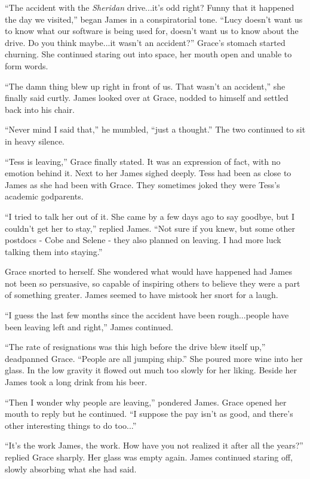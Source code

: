 \documentclass[12pt]{article} %
\begin{document}
``The accident with the \textit{Sheridan} drive...it's odd right? Funny that it happened the day we visited,'' began James in a conspiratorial tone. ``Lucy doesn't want us to know what our software is being used for, doesn't want us to know about the drive. Do you think maybe...it wasn't an accident?'' Grace's stomach started churning. She continued staring out into space, her mouth open and unable to form words. 

``The damn thing blew up right in front of us. That wasn't an accident,'' she finally said curtly. James looked over at Grace, nodded to himself and settled back into his chair.

``Never mind I said that,'' he mumbled, ``just a thought.'' The two continued to sit in heavy silence.

``Tess is leaving,'' Grace finally stated. It was an expression of fact, with no emotion behind it. Next to her James sighed deeply. Tess had been as close to James as she had been with Grace. They sometimes joked they were Tess's academic godparents.

``I tried to talk her out of it. She came by a few days ago to say goodbye, but I couldn't get her to stay,'' replied James. ``Not sure if you knew, but some other postdocs - Cobe and Selene - they also planned on leaving. I had more luck talking them into staying.''

Grace snorted to herself. She wondered what would have happened had James not been so persuasive, so capable of inspiring others to believe they were a part of something greater. James seemed to have mistook her snort for a laugh.

``I guess the last few months since the accident have been rough...people have been leaving left and right,'' James continued.

``The rate of resignations was this high before the drive blew itself up,'' deadpanned Grace. ``People are all jumping ship.'' She poured more wine into her glass. In the low gravity it flowed out much too slowly for her liking. Beside her James took a long drink from his beer.

``Then I wonder why people are leaving,'' pondered James. Grace opened her mouth to reply but he continued. ``I suppose the pay isn't as good, and there's other interesting things to do too...''

``It's the work James, the work. How have you not realized it after all the years?'' replied Grace sharply. Her glass was empty again. James continued staring off, slowly absorbing what she had said.
\end{document}
